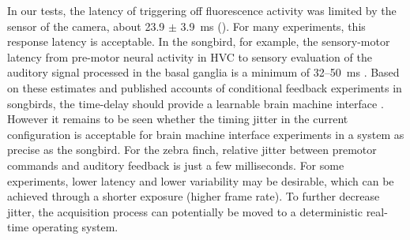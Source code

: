In our tests, the latency of triggering off 
fluorescence activity was limited by the sensor 
of the camera, about 23.9 $\pm$ 3.9~ms 
(). For many experiments, 
this response latency is acceptable. In the songbird, 
for example, the sensory-motor latency from pre-motor 
neural activity in HVC to sensory evaluation of 
the auditory signal processed in the basal ganglia 
is a minimum of 32--50~ms \cite{Andalman:2009bh}. 
Based on these estimates and published accounts 
of conditional feedback experiments in songbirds, 
the time-delay should provide a learnable brain 
machine interface 
\cite{Olveczky:2005bp,Tumer:2007bi,Sakata:2008cm,Sober:2009ci}. 
However it remains to be seen whether the timing 
jitter in the current configuration is acceptable 
for brain machine interface experiments in a 
system as precise as the songbird. For the zebra 
finch, relative jitter between premotor commands 
and auditory feedback is just a few milliseconds. 
For some experiments, lower latency and lower 
variability may be desirable, which can be achieved 
through a shorter exposure (higher frame rate). 
To further decrease jitter, the acquisition process 
can potentially be moved to a deterministic 
real-time operating system.

